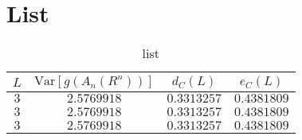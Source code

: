 \section{List}
%
\begin{table}[htb]
  \begin{center}
    \caption{list}
    \begin{tabular}{cccc} \hline
      $L$ & $\mathrm{Var}[g(A_n(R^n))]$ & $d_C(L)$ & $e_C(L)$ \\ \hline \hline
      $3$ & $2.5769918$ & $0.3313257$ & $0.4381809$ \\
      $3$ & $2.5769918$ & $0.3313257$ & $0.4381809$ \\
      $3$ & $2.5769918$ & $0.3313257$ & $0.4381809$ \\ \hline
    \end{tabular}
  \end{center}
\end{table}
%
%
